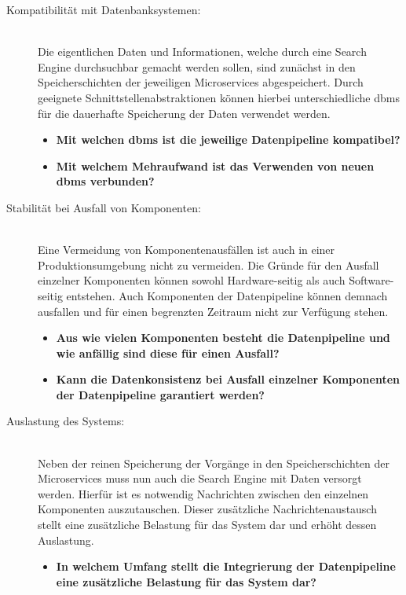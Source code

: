 \begin{description}
    \item[Kompatibilität mit Datenbanksystemen:]\hfill \\
    Die eigentlichen Daten und Informationen, welche durch eine Search Engine \glqq durchsuchbar\grqq{} gemacht werden sollen, sind zunächst in den Speicherschichten der jeweiligen Microservices abgespeichert. Durch geeignete Schnittstellenabstraktionen können hierbei unterschiedliche \gls{dbms} für die dauerhafte Speicherung der Daten verwendet werden.

    \begin{itemize}
        \item \textbf{Mit welchen \gls{dbms} ist die jeweilige Datenpipeline kompatibel?}
        \item \textbf{Mit welchem Mehraufwand ist das Verwenden von \glqq neuen\grqq{} \gls{dbms} verbunden?}
    \end{itemize}
    
    \item[Stabilität bei Ausfall von Komponenten:]\hfill \\
    Eine Vermeidung von Komponentenausfällen ist auch in einer Produktionsumgebung nicht zu vermeiden. Die Gründe für den Ausfall einzelner Komponenten können sowohl Hardware-seitig als auch Software-seitig entstehen. Auch Komponenten der Datenpipeline können demnach ausfallen und für einen begrenzten Zeitraum nicht zur Verfügung stehen.

    \begin{itemize}
        \item \textbf{Aus wie vielen Komponenten besteht die Datenpipeline und wie anfällig sind diese für einen Ausfall?}
        \item \textbf{Kann die Datenkonsistenz bei Ausfall einzelner Komponenten der Datenpipeline garantiert werden?}
    \end{itemize}
    
    \item[Auslastung des Systems:]\hfill \\
    Neben der reinen Speicherung der Vorgänge in den Speicherschichten der Microservices muss nun auch die Search Engine mit Daten versorgt werden. Hierfür ist es notwendig Nachrichten zwischen den einzelnen Komponenten auszutauschen. Dieser zusätzliche Nachrichtenaustausch stellt eine zusätzliche Belastung für das System dar und erhöht dessen Auslastung.

    \begin{itemize}
        \item \textbf{In welchem Umfang stellt die Integrierung der Datenpipeline eine zusätzliche Belastung für das System dar?}
    \end{itemize}


\end{description}
